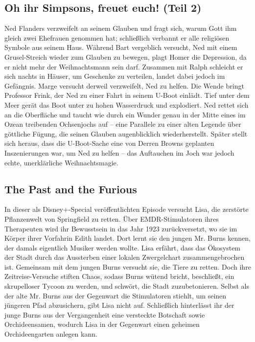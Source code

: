 \subsection{Oh ihr Simpsons, freuet euch! (Teil 2)}
Ned Flanders verzweifelt an seinem Glauben und fragt sich, warum Gott ihm gleich zwei Ehefrauen genommen hat; schließlich verbannt er alle religiösen Symbole aus seinem Haus. Während Bart vergeblich versucht, Ned mit einem Grusel-Streich wieder zum Glauben zu bewegen, plagt Homer die Depression, da er nicht mehr der Weihnachtsmann sein darf. Zusammen mit Ralph schleicht er sich nachts in Häuser, um Geschenke zu verteilen, landet dabei jedoch im Gefängnis. Marge versucht derweil verzweifelt, Ned zu helfen. Die Wende bringt Professor Frink, der Ned zu einer Fahrt in seinem U-Boot einlädt. Tief unter dem Meer gerät das Boot unter zu hohen Wasserdruck und explodiert. Ned rettet sich an die Oberfläche und taucht wie durch ein Wunder genau in der Mitte eines im Ozean treibenden Ochsenjochs auf -- eine Parallele zu einer alten Legende über göttliche Fügung, die seinen Glauben augenblicklich wiederherstellt. Später stellt sich heraus, dass die U-Boot-Sache eine von Derren Browns geplanten Inszenierungen war, um Ned zu helfen -- das Auftauchen im Joch war jedoch echte, unerklärliche Weihnachtsmagie.

\subsection{The Past and the Furious}
In dieser als Disney+-Special veröffentlichten Episode versucht Lisa, die zerstörte Pflanzenwelt von Springfield zu retten. Über EMDR-Stimulatoren ihres Therapeuten wird ihr Bewusstsein in das Jahr 1923 zurückversetzt, wo sie im Körper ihrer Vorfahrin Edith landet. Dort lernt sie den jungen Mr. Burns kennen, der damals eigentlich Musiker werden wollte. Lisa erfährt, dass das Ökosystem der Stadt durch das Aussterben einer lokalen Zwergelchart zusammengebrochen ist. Gemeinsam mit dem jungen Burns versucht sie, die Tiere zu retten. Doch ihre Zeitreise-Versuche stiften Chaos, sodass Burns wütend bricht, beschließt, ein skrupelloser Tycoon zu werden, und schwört, die Stadt zuzubetonieren. Selbst als der alte Mr. Burns aus der Gegenwart die Stimulatoren stiehlt, um seinen jüngeren Pfad abzusichern, gibt Lisa nicht auf. Schließlich hinterlässt ihr der junge Burns aus der Vergangenheit eine versteckte Botschaft sowie Orchideensamen, wodurch Lisa in der Gegenwart einen geheimen Orchideengarten anlegen kann.